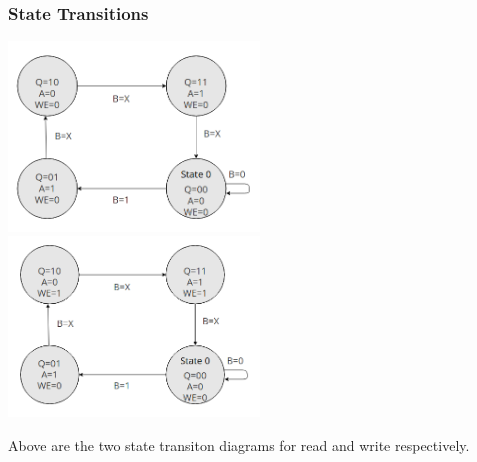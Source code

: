\documentclass{article}
\begin{document}
        \subsubsection{State Transitions}
        
        \begin{center}
            \includegraphics[width=0.5\textwidth]{READ_State_Transition.png}
            \includegraphics[width=0.5\textwidth]{WRITE_State_Transition.png}
        \end{center}

        Above are the two state transiton diagrams for read and write respectively. 
\end{document}

